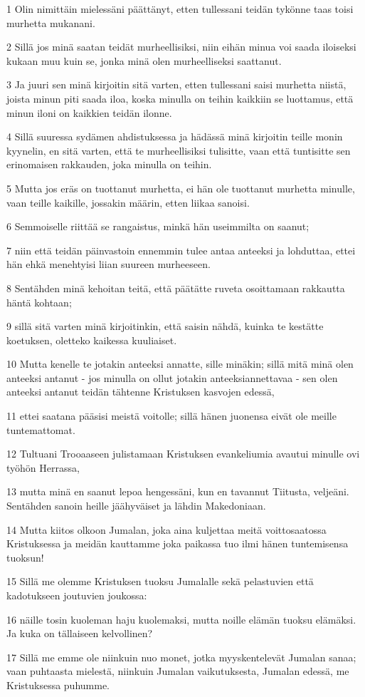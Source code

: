 \par 1 Olin nimittäin mielessäni päättänyt, etten tullessani teidän tykönne taas toisi murhetta mukanani.
\par 2 Sillä jos minä saatan teidät murheellisiksi, niin eihän minua voi saada iloiseksi kukaan muu kuin se, jonka minä olen murheelliseksi saattanut.
\par 3 Ja juuri sen minä kirjoitin sitä varten, etten tullessani saisi murhetta niistä, joista minun piti saada iloa, koska minulla on teihin kaikkiin se luottamus, että minun iloni on kaikkien teidän ilonne.
\par 4 Sillä suuressa sydämen ahdistuksessa ja hädässä minä kirjoitin teille monin kyynelin, en sitä varten, että te murheellisiksi tulisitte, vaan että tuntisitte sen erinomaisen rakkauden, joka minulla on teihin.
\par 5 Mutta jos eräs on tuottanut murhetta, ei hän ole tuottanut murhetta minulle, vaan teille kaikille, jossakin määrin, etten liikaa sanoisi.
\par 6 Semmoiselle riittää se rangaistus, minkä hän useimmilta on saanut;
\par 7 niin että teidän päinvastoin ennemmin tulee antaa anteeksi ja lohduttaa, ettei hän ehkä menehtyisi liian suureen murheeseen.
\par 8 Sentähden minä kehoitan teitä, että päätätte ruveta osoittamaan rakkautta häntä kohtaan;
\par 9 sillä sitä varten minä kirjoitinkin, että saisin nähdä, kuinka te kestätte koetuksen, oletteko kaikessa kuuliaiset.
\par 10 Mutta kenelle te jotakin anteeksi annatte, sille minäkin; sillä mitä minä olen anteeksi antanut - jos minulla on ollut jotakin anteeksiannettavaa - sen olen anteeksi antanut teidän tähtenne Kristuksen kasvojen edessä,
\par 11 ettei saatana pääsisi meistä voitolle; sillä hänen juonensa eivät ole meille tuntemattomat.
\par 12 Tultuani Trooaaseen julistamaan Kristuksen evankeliumia avautui minulle ovi työhön Herrassa,
\par 13 mutta minä en saanut lepoa hengessäni, kun en tavannut Tiitusta, veljeäni. Sentähden sanoin heille jäähyväiset ja lähdin Makedoniaan.
\par 14 Mutta kiitos olkoon Jumalan, joka aina kuljettaa meitä voittosaatossa Kristuksessa ja meidän kauttamme joka paikassa tuo ilmi hänen tuntemisensa tuoksun!
\par 15 Sillä me olemme Kristuksen tuoksu Jumalalle sekä pelastuvien että kadotukseen joutuvien joukossa:
\par 16 näille tosin kuoleman haju kuolemaksi, mutta noille elämän tuoksu elämäksi. Ja kuka on tällaiseen kelvollinen?
\par 17 Sillä me emme ole niinkuin nuo monet, jotka myyskentelevät Jumalan sanaa; vaan puhtaasta mielestä, niinkuin Jumalan vaikutuksesta, Jumalan edessä, me Kristuksessa puhumme.


